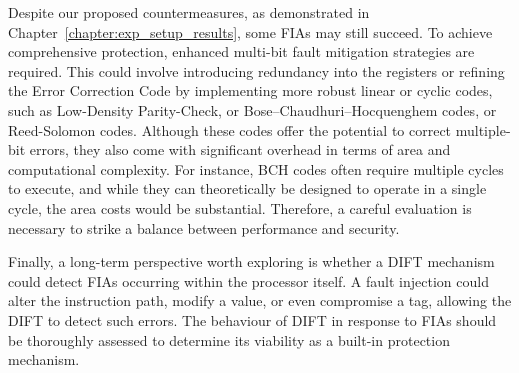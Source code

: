 Despite our proposed countermeasures, as demonstrated in Chapter~\ref{chapter:exp_setup_results}, some FIAs may still succeed. To achieve comprehensive protection, enhanced multi-bit fault mitigation strategies are required. This could involve introducing redundancy into the registers or refining the Error Correction Code by implementing more robust linear or cyclic codes, such as Low-Density Parity-Check, or Bose–Chaudhuri–Hocquenghem codes, or Reed-Solomon codes. Although these codes offer the potential to correct multiple-bit errors, they also come with significant overhead in terms of area and computational complexity. For instance, BCH codes often require multiple cycles to execute, and while they can theoretically be designed to operate in a single cycle, the area costs would be substantial. Therefore, a careful evaluation is necessary to strike a balance between performance and security.

Finally, a long-term perspective worth exploring is whether a DIFT mechanism could detect FIAs occurring within the processor itself. A fault injection could alter the instruction path, modify a value, or even compromise a tag, allowing the DIFT to detect such errors. The behaviour of DIFT in response to FIAs should be thoroughly assessed to determine its viability as a built-in protection mechanism.

